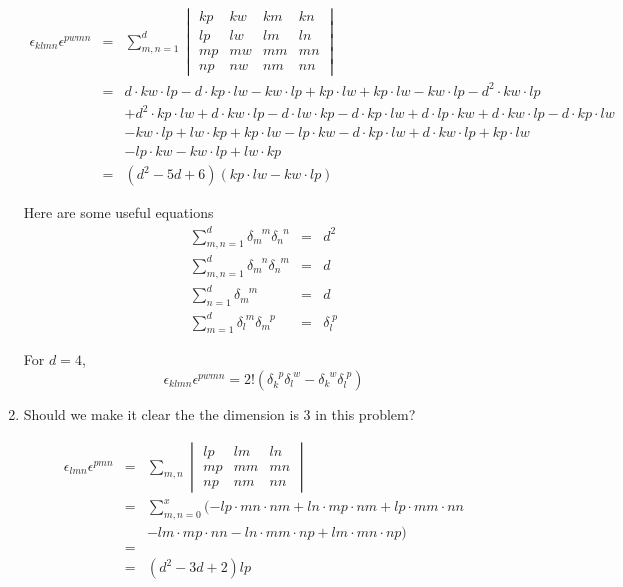 \documentclass[12pt,a4paper]{article}
\begin{document}
\begin{enumerate}
\begin{eqnarray*}
\epsilon_{klmn}\epsilon^{pwmn}&=& \sum_{m,n=1}^{d}
\begin{vmatrix}
	kp & kw & km & kn \\
	lp & lw & lm & ln \\
	mp & mw & mm & mn \\
	np & nw & nm & nn
\end{vmatrix} \\
&=& d\cdot kw\cdot lp - d\cdot kp \cdot lw - kw\cdot lp + kp \cdot lw + kp \cdot lw - kw \cdot lp - d^2\cdot kw \cdot lp \\
&& + d^2\cdot kp \cdot lw + d\cdot kw \cdot lp - d \cdot lw \cdot kp -d\cdot kp \cdot lw + d\cdot lp \cdot kw + d\cdot kw \cdot lp - d\cdot kp \cdot lw \\
&& -  kw \cdot lp  + lw \cdot kp + kp \cdot lw - lp \cdot kw  - d\cdot kp \cdot lw + d\cdot kw \cdot lp + kp \cdot lw  \\
&&- lp \cdot kw -kw \cdot lp + lw \cdot kp \\
&=& (d^2 -5d + 6)(kp\cdot lw - kw \cdot lp)
\end{eqnarray*}

Here are some useful equations
\begin{eqnarray*}
	\sum_{m,n=1}^d \delta_{m}^{\phantom mm}\delta_{n}^{\phantom nn} &=& d^2 \\
	\sum_{m,n=1}^d \delta_m ^{\phantom mn} \delta_{n}^{\phantom nm} &=& d \\
	\sum_{n=1}^d \delta_{m}^{\phantom mm} &=& d \\
	\sum_{m=1}^d \delta_l^{\phantom lm}\delta_m^{\phantom mp} &=& \delta_l^{\phantom lp}
\end{eqnarray*}

For $d=4$,
\begin{equation}
	\epsilon_{klmn}\epsilon^{pwmn} = 2!(\delta _k^{\phantom kp} \delta_{l}^{\phantom lw} - \delta_k^{\phantom kw} \delta_l^{\phantom lp})
\end{equation}


\item
{\color{red}Should we make it clear the the dimension is 3 in this problem?}

\begin{eqnarray*}
	\epsilon_{lmn}\epsilon^{pmn} &=& \sum_{m,n}
\begin{vmatrix}
	lp & lm & ln \\
	mp & mm & mn \\
	np & nm & nn
\end{vmatrix}
\\ &=& \sum_{m,n =0 }^x  (-lp\cdot mn \cdot nm + ln \cdot mp \cdot nm + lp \cdot mm \cdot nn \\
&& - lm \cdot mp \cdot nn - ln \cdot mm \cdot np + lm \cdot mn \cdot np )\\
&=&  \\
&=& (d^2 -3d + 2)lp
\end{eqnarray*}


\end{enumerate}
\end{document}
